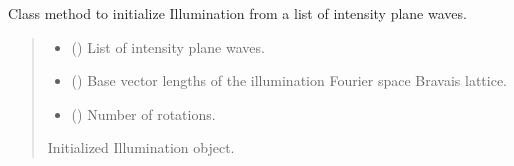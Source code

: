 \documentclass[letterpaper,10pt,english]{sphinxmanual}
\begin{document}
\begin{fulllineitems}
\begin{fulllineitems}
\label{\detokenize{source/Illumination:Illumination.Illumination.init_from_list}}
\pysigstartsignatures
\pysiglinewithargsret
{}
{\sphinxparamcomma {}\sphinxparamcomma {}}
{}
\pysigstopsignatures
\sphinxAtStartPar
Class method to initialize Illumination from a list of intensity plane waves.
\begin{quote}\begin{description}
\begin{itemize}
\item {} 
\sphinxAtStartPar
{} () \textendash{} List of intensity plane waves.

\item {} 
\sphinxAtStartPar
{} () \textendash{} Base vector lengths of the illumination Fourier space Bravais lattice.

\item {} 
\sphinxAtStartPar
{} () \textendash{} Number of rotations.

\end{itemize}

\sphinxAtStartPar
Initialized Illumination object.

\sphinxAtStartPar
{\hyperref[\detokenize{source/Illumination:Illumination.Illumination}]{}}

\end{description}\end{quote}


\end{fulllineitems}
\end{fulllineitems}
\end{document}
